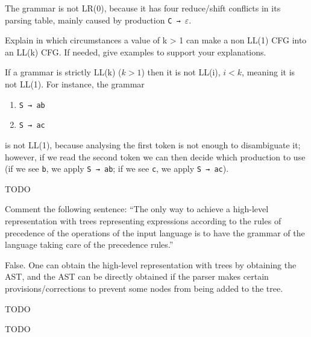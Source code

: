 \documentclass[docid=2019]{comp_exam_round2}
\begin{document}
The grammar is not LR(0), because it has four reduce/shift conflicts in its parsing table, mainly caused by production \texttt{C → $\varepsilon$}.

\question
Explain in which circumstances a value of k > 1 can make a non LL(1) CFG into an LL(k) CFG.
If needed, give examples to support your explanations.

\ansseparator

If a grammar is strictly LL(k) ($k>1$) then it is not LL(i), $i < k$, meaning it is not LL(1). For instance, the grammar

\begin{enumerate}
    \item \texttt{S → ab}
    \item \texttt{S → ac}
\end{enumerate}

\noindent
is not LL(1), because analysing the first token is not enough to disambiguate it; however, if we read the second token we can then decide which production to use (if we see \texttt{b}, we apply \texttt{S → ab}; if we see \texttt{c}, we apply \texttt{S → ac}).

\examgroup{}

TODO

\examgroup{}

\question
Comment the following sentence: ``The
only way to achieve a high-level representation
with trees representing expressions according
to the rules of precedence of the operations of
the input language is to have the grammar of
the language taking care of the precedence
rules.''

\ansseparator

\noindent
False. One can obtain the high-level representation with trees by obtaining the AST, and the AST can be directly obtained if the parser makes certain provisions/corrections to prevent some nodes from being added to the tree.

\examgroup{}

TODO

\examgroup{}

TODO
\end{document}
